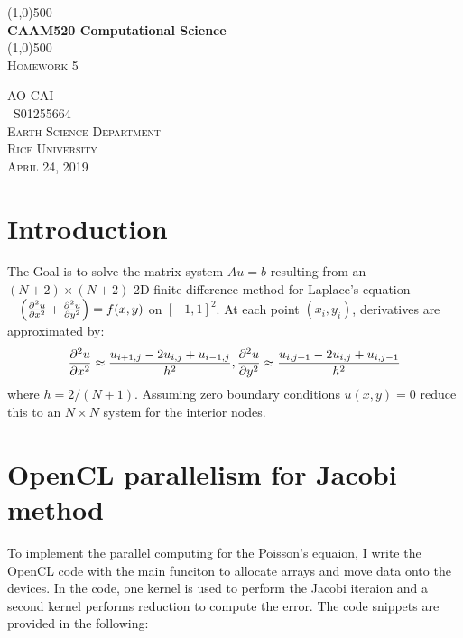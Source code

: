 \documentclass[12pt]{article}
\begin{document}
\begin{titlepage}
	\begin{center}
	\line(1,0){500}\\
	[0.25in]
	\huge{\bfseries CAAM520 Computational Science}\\
	[2mm]
	\line(1,0){500}\\
	[1.5cm]
	\textsc{\LARGE Homework 5}\\
	[8cm] 
	\end{center}
	\begin{flushright}
	\textsc{\large AO CAI \\
	\ S01255664\\
	Earth Science Department\\
	Rice University\\
	April 24, 2019\\}
	\end{flushright}
\end{titlepage}
\tableofcontents
\thispagestyle{empty}
\cleardoublepage
\setcounter{page}{1}
\section{Introduction}\label{sec:intro}
The Goal is to solve the matrix system {\bfseries$Au=b$} resulting from an $(N+2)\times(N+2)$ 2D finite difference method for Laplace's equation $-\left(\pdv[2]{u}{x} + \pdv[2]{u}{y} \right) = f(x,y)$ on $[-1,1]^2$. At each point $(x_i,y_i)$, derivatives are approximated by:
$$\pdv[2]{u}{x} \approx \frac{u_{i+1,j}-2u_{i,j}+u_{i-1,j}}{h^2}, \pdv[2]{u}{y} \approx \frac{u_{i,j+1}-2u_{i,j}+u_{i,j-1}}{h^2}$$
where $h = 2/(N+1)$. Assuming zero boundary conditions $u(x,y) = 0$ reduce this to an $N \times N$ system for the interior nodes.
\section{OpenCL parallelism for Jacobi method}
To implement the parallel computing for the Poisson's equaion, I write the OpenCL code with the main funciton to allocate arrays and move data onto the devices. In the code, one kernel is used to perform the Jacobi iteraion and a second kernel performs reduction to compute the error. The code snippets are provided in the following:\\


\end{document}
